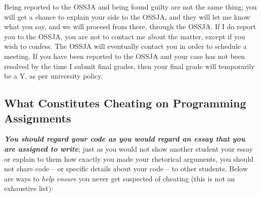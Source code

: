 \documentclass{article}
\begin{document}
Being reported to the OSSJA and being found guilty are not the same thing; you will get a chance to explain your side to the OSSJA, and they will let me know what you say, and we will proceed from there, through the OSSJA. If I do report you to the OSSJA, you are not to contact me about the matter, except if you wish to confess. The OSSJA will eventually contact you in order to schedule a meeting. If you have been reported to the OSSJA and your case has not been resolved by the time I submit final grades, then your final grade will temporarily be a Y, as per university policy.

\subsection{What Constitutes Cheating on Programming Assignments}

\textbf{\textit{You should regard your code as you would regard an essay that you are assigned to write}}; just as you would not show another student your essay or explain to them how exactly you made your rhetorical arguments, you should not share code -- or specific details about your code -- to other students. Below are ways to \textit{help ensure} you never get suspected of cheating (this is not an exhaustive list):
\end{document}
